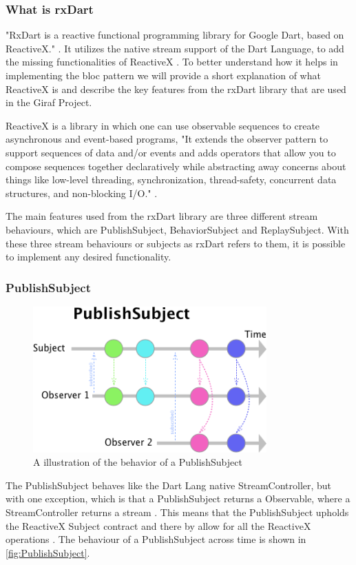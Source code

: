 \subsubsection{What is rxDart}
"RxDart is a reactive functional programming library for Google Dart, based on ReactiveX." \cite{rxDart}. It utilizes the native stream support of the Dart Language, to add the missing functionalities of ReactiveX \cite{rxDart}. To better understand how it helps in implementing the \gls{bloc} pattern we will provide a short explanation of what ReactiveX is and describe the key features from the rxDart library that are used in the Giraf Project.

ReactiveX is a library in which one can use observable sequences to create asynchronous and event-based programs, "It extends the observer pattern to support sequences of data and/or events and adds operators that allow you to compose sequences together declaratively while abstracting away concerns about things like low-level threading, synchronization, thread-safety, concurrent data structures, and non-blocking I/O." \cite{ReactiveXWebsite}.

The main features used from the rxDart library are three different stream behaviours, which are PublishSubject, BehaviorSubject and ReplaySubject. With these three stream behaviours or subjects as rxDart refers to them, it is possible to implement any desired functionality.

\subsubsection*{PublishSubject}
\begin{figure}[h]
    \centering
    \includegraphics[width=0.8\textwidth]{figures/PublishSubject.png}
    \caption{A illustration of the behavior of a PublishSubject}
    \label{fig:PublishSubject}
\end{figure}
The PublishSubject behaves like the Dart Lang native StreamController, but with one exception, which is that a PublishSubject returns a Observable, where a StreamController returns a stream \cite{PublishSubject}. This means that the PublishSubject upholds the ReactiveX Subject contract and there by allow for all the ReactiveX operations \cite{PublishSubject}. The behaviour of a PublishSubject across time is shown in \autoref{fig:PublishSubject}.

